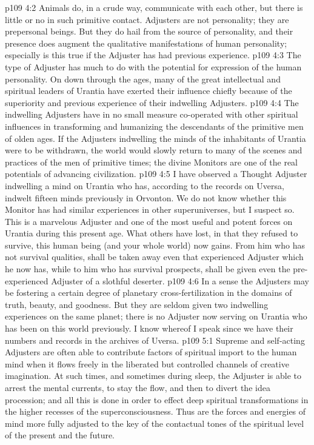 \vs p109 4:2 Animals do, in a crude way, communicate with each other, but there is little or no  in such primitive contact. Adjusters are not personality; they are prepersonal beings. But they do hail from the source of personality, and their presence does augment the qualitative manifestations of human personality; especially is this true if the Adjuster has had previous experience.
\vs p109 4:3 The type of Adjuster has much to do with the potential for expression of the human personality. On down through the ages, many of the great intellectual and spiritual leaders of Urantia have exerted their influence chiefly because of the superiority and previous experience of their indwelling Adjusters.
\vs p109 4:4 The indwelling Adjusters have in no small measure co\hyp{}operated with other spiritual influences in transforming and humanizing the descendants of the primitive men of olden ages. If the Adjusters indwelling the minds of the inhabitants of Urantia were to be withdrawn, the world would slowly return to many of the scenes and practices of the men of primitive times; the divine Monitors are one of the real potentials of advancing civilization.
\pc \vs p109 4:5 I have observed a Thought Adjuster indwelling a mind on Urantia who has, according to the records on Uversa, indwelt fifteen minds previously in Orvonton. We do not know whether this Monitor has had similar experiences in other superuniverses, but I suspect so. This is a marvelous Adjuster and one of the most useful and potent forces on Urantia during this present age. What others have lost, in that they refused to survive, this human being (and your whole world) now gains. From him who has not survival qualities, shall be taken away even that experienced Adjuster which he now has, while to him who has survival prospects, shall be given even the pre\hyp{}experienced Adjuster of a slothful deserter.
\vs p109 4:6 In a sense the Adjusters may be fostering a certain degree of planetary cross\hyp{}fertilization in the domains of truth, beauty, and goodness. But they are seldom given two indwelling experiences on the same planet; there is no Adjuster now serving on Urantia who has been on this world previously. I know whereof I speak since we have their numbers and records in the archives of Uversa.
\vs p109 5:1 Supreme and self\hyp{}acting Adjusters are often able to contribute factors of spiritual import to the human mind when it flows freely in the liberated but controlled channels of creative imagination. At such times, and sometimes during sleep, the Adjuster is able to arrest the mental currents, to stay the flow, and then to divert the idea procession; and all this is done in order to effect deep spiritual transformations in the higher recesses of the superconsciousness. Thus are the forces and energies of mind more fully adjusted to the key of the contactual tones of the spiritual level of the present and the future.
